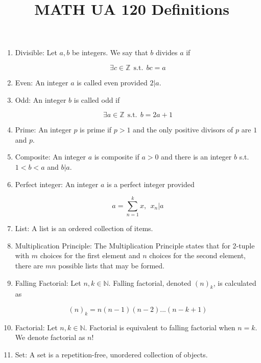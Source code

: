 \documentclass{article}
\title{MATH UA 120 Definitions}
\date{}
\begin{document}
\maketitle

\begin{enumerate}
    \item Divisible: Let $a,b$ be integers. We say that $b$ divides $a$ if 
    
    \[\exists c\in\mathbb{Z}\:\: \text{s.t.} \:\: bc=a\]
    
    \item Even: An integer $a$ is called even provided $2|a$.
    
    \item Odd: An integer $b$ is called odd if
    
    \[\exists a\in\mathbb{Z} \:\: \text{s.t.} \:\: b=2a+1\]
    
    \item Prime: An integer $p$ is prime if $p>1$ and the only positive divisors of $p$ are $1$ and $p$.
    
    \item Composite: An integer $a$ is composite if $a>0$ and there is an integer $b$ s.t. $1<b<a$ and $b|a$.
    
    \item Perfect integer: An integer $a$ is a perfect integer provided 
    
    \[a=\sum_{n=1}^k x,\:\: x_n|a\]
    
    \item List: A list is an ordered collection of items.
    
    \item Multiplication Principle: The Multiplication Principle states that for 2-tuple with $m$ choices for the first element and $n$ choices for the second element, there are $mn$ possible lists that may be formed.
    
    \item Falling Factorial: Let $n,k\in\mathbb{N}$. Falling factorial, denoted $(n)_k$, is calculated as
    
    \[(n)_k=n(n-1)(n-2)...(n-k+1)\]
    
    \item Factorial: Let $n,k\in\mathbb{N}$. Factorial is equivalent to falling factorial when $n=k$. We denote factorial as $n!$
    
    \item Set: A set is a repetition-free, unordered collection of objects.
    

\end{enumerate}
\end{document}
